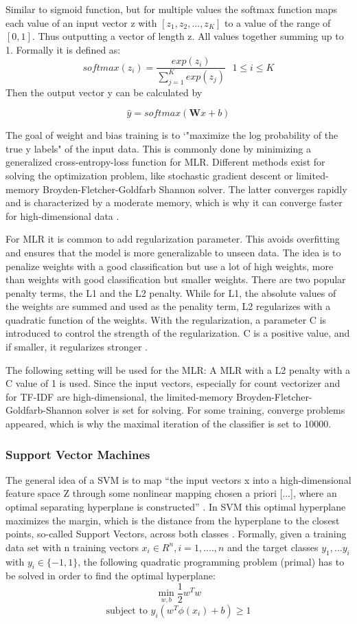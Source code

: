 \documentclass[12pt, a4paper, titlepage]{article}
\begin{document}
Similar to sigmoid function, but for multiple values the softmax function maps each value of an input vector z with $[z_1, z_2, ..., z_K]$ to a value of the range of $[0,1]$. Thus outputting a vector of length z. All values together summing up to 1. Formally it is defined as: 
\[ softmax(z_i) = \frac{exp(z_i)}{\sum^K_{j=1} exp(z_j)} \text{ } 1 \leq i \leq K \]
Then the output vector y can be calculated by 

\[ \hat{y} = softmax(\textbf{W}x+b) \]

The goal of weight and bias training is to `"maximize the log probability of the true y labels" of the input data. This is commonly done by minimizing a generalized cross-entropy-loss function for \ac{MLR}. Different methods exist for solving the optimization problem, like stochastic gradient descent or limited-memory Broyden-Fletcher-Goldfarb Shannon solver. The latter converges rapidly and is characterized by a moderate memory, which is why it can converge faster for high-dimensional data \citep{fei2014, scikit-learn}. 

For \ac{MLR} it is common to add regularization parameter. This avoids overfitting and ensures that the model is more generalizable to unseen data. The idea is to penalize weights with a good classification but use a lot of high weights, more than weights with good classification but smaller weights. There are two popular penalty terms, the L1 and the L2 penalty. While for L1, the absolute values of the weights are summed and used as the penality term, L2 regularizes with a quadratic function of the weights. With the regularization, a parameter C is introduced to control the strength of the regularization. C is a positive value, and if smaller, it regularizes stronger \citep{jurafsky2021}. 

The following setting will be used for the \ac{MLR}: A \ac{MLR} with a L2 penalty with a C value of 1 is used. Since the input vectors, especially for count vectorizer and for \ac{TF-IDF} are high-dimensional, the limited-memory Broyden-Fletcher-Goldfarb-Shannon solver is set for solving. For some training, converge problems appeared, which is why the maximal iteration of the classifier is set to 10000.

\subsubsection{Support Vector Machines}
 The general idea of a \ac{SVM} is to map ``the input vectors x into a high-dimensional feature space Z through some nonlinear mapping chosen a priori [...], where an optimal separating hyperplane is constructed'' \citep[138]{Vapnik2000}. In \ac{SVM} this optimal hyperplane maximizes the margin, which is the distance from the hyperplane to the closest points, so-called Support Vectors, across both classes \citep{Han2012}. Formally, given a training data set with n training vectors $x_i \in R^n, i = 1,....,n$ and the target classes $y_1,...y_i$ with $y_i \in \{-1, 1\}$, the following quadratic programming problem (primal) has to be solved in order to find the optimal hyperplane:
\[\min_{w,b} \frac{1}{2}w^{T}w \] 
\[\text{subject to } y_i(w^T\phi(x_i)+b) \geq 1\]
\end{document}
